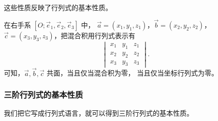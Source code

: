 \documentclass[UTF8,11pt]{ctexart}
\theoremstyle{cnthm}
\begin{document}
这些性质反映了行列式的基本性质。

在右手系 $[O;\vec e_1,\vec e_2,\vec e_3]$ 中，
$\vec a=(x_1,y_1,z_1)$，$\vec b=(x_2,y_2,z_2)$，
$\vec c=(x_3,y_3,z_3)$，把混合积用行列式表示有
\[
\begin{vmatrix}
x_1 & y_1 & z_1\\
x_2 & y_2 & z_2\\
x_3 & y_3 & z_3
\end{vmatrix}.
\]
可知，$\vec a,\vec b,\vec c$ 共面，当且仅当混合积为零，
当且仅当坐标行列式为零。

\subsubsection*{三阶行列式的基本性质}

我们把它写成行列式语言，就可以得到三阶行列式的基本性质。
\end{document}
